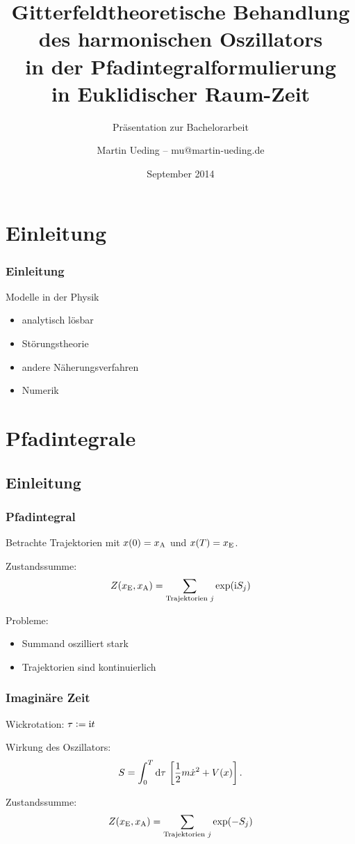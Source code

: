\documentclass[ngerman, fleqn]{beamer}
\title{%
    Gitterfeldtheoretische Behandlung\\
    des harmonischen Oszillators\\
    in der Pfadintegralformulierung\\
    in Euklidischer Raum-Zeit
}
\subtitle{Präsentation zur Bachelorarbeit}
\author{Martin Ueding – mu@martin-ueding.de}
\date{September 2014}
\renewcommand\iup{\text i}
\begin{document}
\begin{frame}
    \titlepage
\end{frame}

\section*{Einleitung}

\begin{frame}
    \frametitle{Einleitung}

    Modelle in der Physik

    \begin{itemize}
        \item
            analytisch lösbar
        \item
            Störungstheorie
        \item
            andere Näherungsverfahren
        \item
            Numerik
    \end{itemize}
\end{frame}

\begin{frame}
    \tableofcontents
\end{frame}

\section{Pfadintegrale}

\frame\sectionpage

\subsection{Einleitung}

\begin{frame}
    \frametitle{Pfadintegral}

    Betrachte Trajektorien mit $x(0) = x_\text A$ und $x(T) = x_\text E$.

    Zustandssumme:
    \[
        Z(x_\text E, x_\text A) = \sum_{\text{Trajektorien $j$}} \exp(\iup S_j)
    \]

    Probleme:
    \begin{itemize}
        \item Summand oszilliert stark
        \item Trajektorien sind kontinuierlich
    \end{itemize}
\end{frame}

\begin{frame}
    \frametitle{Imaginäre Zeit}

    Wickrotation: $\tau := \iup t$

    Wirkung des Oszillators:
    \[
        S = \int_0^T \dif \tau \, \sbr{\frac 12 m \dot x^2 + V(x)}.
    \]

    Zustandssumme:
    \[
        Z(x_\text E, x_\text A) = \sum_{\text{Trajektorien $j$}} \exp(- S_j)
    \]
\end{frame}
\end{document}
